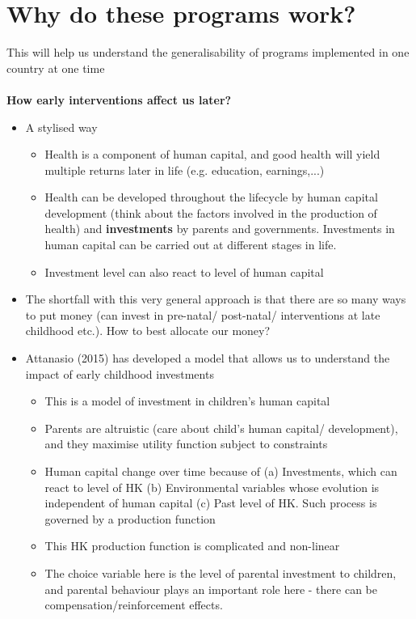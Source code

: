     
\section{Why do these programs work?}
This will help us understand the generalisability of programs implemented in one country at one time\\ \\
\textbf{How early interventions affect us later?}
\begin{itemize}
\item A stylised way
\begin{itemize}
    \item Health is a component of human capital, and good health will yield multiple returns later in life (e.g. education, earnings,...)
    \item Health can be developed throughout the lifecycle by human capital development (think about the factors involved in the production of health) and \textbf {\large{investments}} by parents and governments. Investments in human capital can be carried out at different stages in life.
    \item Investment level can also react to level of human capital
\end{itemize}
\item The shortfall with this very general approach is that there are so many ways to put money (can invest in pre-natal/ post-natal/ interventions at late childhood etc.). How to best allocate our money? 
\item Attanasio (2015) has developed a model that allows us to understand the impact of early childhood investments
\begin{itemize}
    \item This is a model of investment in children's human capital
    \item Parents are altruistic (care about child's human capital/ development), and they maximise utility function subject to constraints
    \item Human capital change over time because of (a) Investments, which can react to level of HK (b) Environmental variables whose evolution is independent of human capital (c) Past level of HK. Such process is governed by a production function
    \item This HK production function is complicated and non-linear
    \item The choice variable here is the level of parental investment to children, and parental behaviour plays an important role here - there can be compensation/reinforcement effects.

\end{itemize}
\end{itemize}
